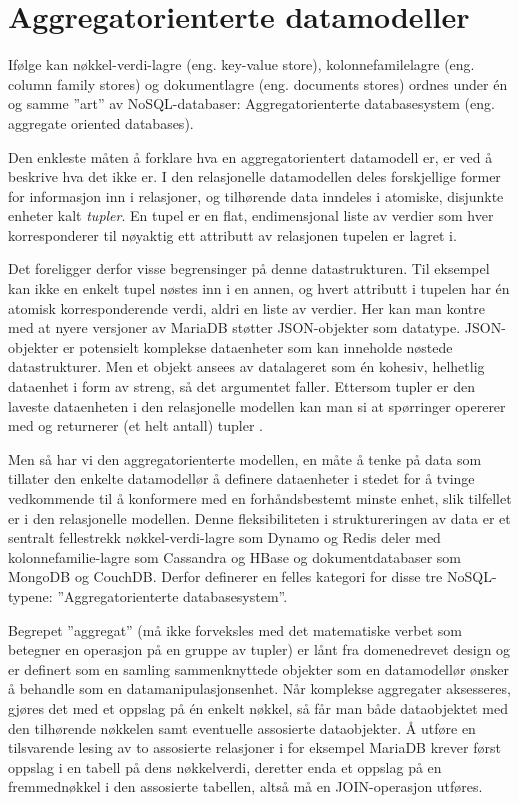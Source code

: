 \section{Aggregatorienterte datamodeller}

Ifølge \cite{sadalage2013} kan nøkkel-verdi-lagre (eng. key-value store), kolonnefamilelagre (eng. column family stores) og dokumentlagre (eng. documents stores) ordnes under én og samme ''art'' av NoSQL-databaser: Aggregatorienterte databasesystem (eng. aggregate oriented databases).

Den enkleste måten å forklare hva en aggregatorientert datamodell er, er ved å beskrive hva det ikke er. I den relasjonelle datamodellen deles forskjellige former for informasjon inn i relasjoner, og tilhørende data inndeles i atomiske, disjunkte enheter kalt \emph{tupler}. En tupel er en flat, endimensjonal liste av verdier som hver korresponderer til nøyaktig ett attributt av relasjonen tupelen er lagret i.

Det foreligger derfor visse begrensinger på denne datastrukturen. Til eksempel kan ikke en enkelt tupel nøstes inn i en annen, og hvert attributt i tupelen har én atomisk korresponderende verdi, aldri en liste av verdier. Her kan man kontre med at nyere versjoner av MariaDB støtter JSON-objekter som datatype. JSON-objekter er potensielt komplekse dataenheter som kan inneholde nøstede datastrukturer. Men et objekt ansees av datalageret som én kohesiv, helhetlig dataenhet i form av streng, så det argumentet faller. Ettersom tupler er den laveste dataenheten i den relasjonelle modellen kan man si at spørringer opererer med og returnerer (et helt antall) tupler \citep{sadalage2013}.

Men så har vi den aggregatorienterte modellen, en måte å tenke på data som tillater den enkelte datamodellør å definere dataenheter i stedet for å tvinge vedkommende til å konformere med en forhåndsbestemt minste enhet, slik tilfellet er i den relasjonelle modellen. Denne fleksibiliteten i struktureringen av data er et sentralt fellestrekk nøkkel-verdi-lagre som Dynamo og Redis deler med kolonnefamilie-lagre som Cassandra og HBase og dokumentdatabaser som MongoDB og CouchDB. Derfor definerer \cite{sadalage2013} en felles kategori for disse tre NoSQL-typene: ''Aggregatorienterte databasesystem''.

Begrepet ''aggregat'' (må ikke forveksles med det matematiske verbet som betegner en operasjon på en gruppe av tupler) er lånt fra domenedrevet design og er definert som en samling sammenknyttede objekter som en datamodellør ønsker å behandle som en datamanipulasjonsenhet. Når komplekse aggregater aksesseres, gjøres det med et oppslag på én enkelt nøkkel, så får man både dataobjektet med den tilhørende nøkkelen samt eventuelle assosierte dataobjekter. Å utføre en tilsvarende lesing av to assosierte relasjoner i for eksempel MariaDB krever først oppslag i en tabell på dens nøkkelverdi, deretter enda et oppslag på en fremmednøkkel i den assosierte tabellen, altså må en JOIN-operasjon utføres. 

